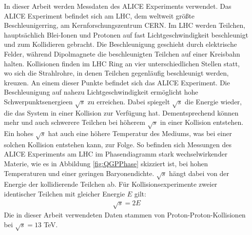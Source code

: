 In dieser Arbeit werden Messdaten des ALICE Experiments verwendet.
Das ALICE Experiment befindet sich am LHC, dem weltweit gr\"o{\ss}te Beschleunigerring, am Kernforschungszentrum CERN.
Im LHC werden Teilchen, haupts\"achlich Blei-Ionen und Protonen auf fast Lichtgeschwindigkeit beschleunigt und zum Kollidieren gebracht.
Die Beschleunigung geschieht durch elektrische Felder, w\"ahrend Dipolmagnete die beschleunigten Teilchen auf einer Kreisbahn halten.
Kollisionen finden im LHC Ring an vier unterschiedlichen Stellen statt, wo sich die Strahlrohre, in denen Teilchen gegenl\"aufig beschleunigt werden, kreuzen.
An einem dieser Punkte befindet sich das ALICE Experiment.
\newline
Die Beschleunigung auf nahezu Lichtgeschwindigkeit erm\"oglicht hohe Schwerpunktsenergieen $\sqrt{s}$ zu erreichen.
Dabei spiegelt $\sqrt{s}$ die Energie wieder, die das System in einer Kollision zur Verf\"ugung hat.
Dementsprechend k\"onnen mehr und auch schwerere Teilchen bei h\"oherem $\sqrt{s}$  in einer Kollision entstehen.
Ein hohes $\sqrt{s}$ hat auch eine h\"ohere Temperatur des Mediums, was bei einer solchen Kollision entstehen kann, zur Folge.
So befinden sich Messungen des ALICE Experiments am LHC im Phasendiagramm stark wechselwirkender Materie, wie es in Abbildung \ref{fig:QGPPhase} skizziert ist, bei hohen Temperaturen und einer geringen Baryonendichte.
$\sqrt{s}$ h\"angt dabei von der Energie der kollidierende Teilchen ab.
F\"ur Kollisionsexperimente zweier identischer Teilchen mit gleicher Energie $E$ gilt:
\begin{align}
\sqrt{s} = 2E \label{eq:sqrts}
\end{align}
\newline
Die in dieser Arbeit verwendeten Daten stammen von Proton-Proton-Kollisionen bei $\sqrt{s} = 13$ TeV.